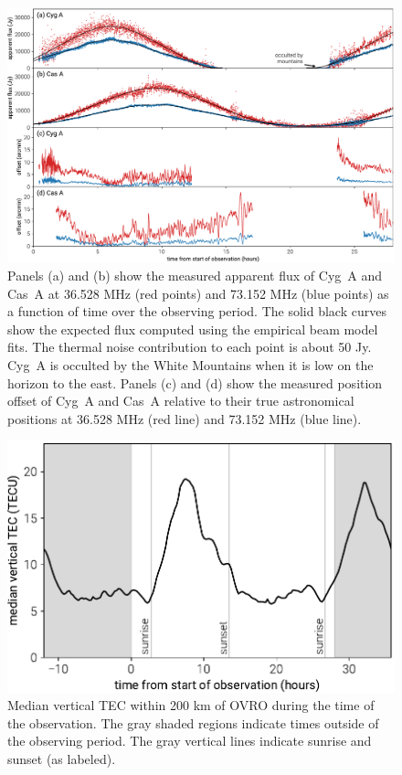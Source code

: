 \documentclass[twocolumn]{aastex61}
\begin{document}
\begin{figure}[t]
    \includegraphics[width=\textwidth]{figures/scintillation-refraction/scintillation-refraction}
    \caption{
        Panels (a) and (b) show the measured apparent flux of Cyg~A and Cas~A at 36.528 MHz (red
        points) and 73.152 MHz (blue points) as a function of time over the observing period. The
        solid black curves show the expected flux computed using the empirical beam model fits. The
        thermal noise contribution to each point is about 50 Jy.  Cyg~A is occulted by the White
        Mountains when it is low on the horizon to the east.
        Panels (c) and (d) show the measured position offset of Cyg~A and Cas~A relative to their
        true astronomical positions at 36.528 MHz (red line) and 73.152 MHz (blue line).
    }
    \label{fig:scintillation}
\end{figure}

\begin{figure}[t]
    \includegraphics[width=\columnwidth]{figures/vtec/vtec}
    \caption{
        Median vertical TEC within 200 km of OVRO during the time of the observation. The gray
        shaded regions indicate times outside of the observing period. The gray vertical lines
        indicate sunrise and sunset (as labeled).
    }
    \label{fig:vtec}
\end{figure}
\end{document}
